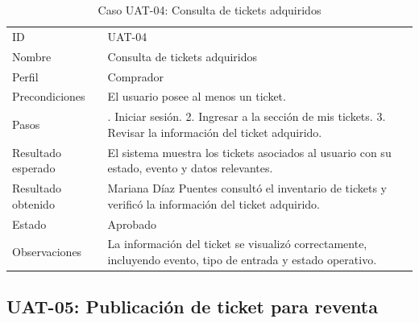 \documentclass[12pt,letterpaper]{article}
\begin{document}
\begin{table}[H]
\centering
\begingroup
\footnotesize
\setlength{\tabcolsep}{3pt}
\renewcommand{\arraystretch}{1.25}

\begin{tabularx}{\textwidth}{|
>{\raggedright\arraybackslash}p{3.4cm}|
>{\raggedright\arraybackslash}X|}
\hline
\multicolumn{1}{|>{\centering\arraybackslash}m{3.4cm}|}{\textbf{Campo}} &
\multicolumn{1}{>{\centering\arraybackslash}m{10.8cm}|}{\textbf{Contenido}} \\
\hline
ID & UAT-04 \\
\hline
Nombre & Consulta de tickets adquiridos \\
\hline
Perfil & Comprador \\
\hline
Precondiciones & El usuario posee al menos un ticket. \\
\hline
Pasos & 1. Iniciar sesión. 2. Ingresar a la sección de mis tickets. 3. Revisar la información del ticket adquirido. \\
\hline
Resultado esperado & El sistema muestra los tickets asociados al usuario con su estado, evento y datos relevantes. \\
\hline
Resultado obtenido & Mariana Díaz Puentes consultó el inventario de tickets y verificó la información del ticket adquirido. \\
\hline
Estado & Aprobado \\
\hline
Observaciones & La información del ticket se visualizó correctamente, incluyendo evento, tipo de entrada y estado operativo. \\
\hline
\end{tabularx}

\endgroup
\caption{Caso UAT-04: Consulta de tickets adquiridos}
\label{tab:uat-04-inventario}
\end{table}

\subsection{UAT-05: Publicación de ticket para reventa}
\end{document}
